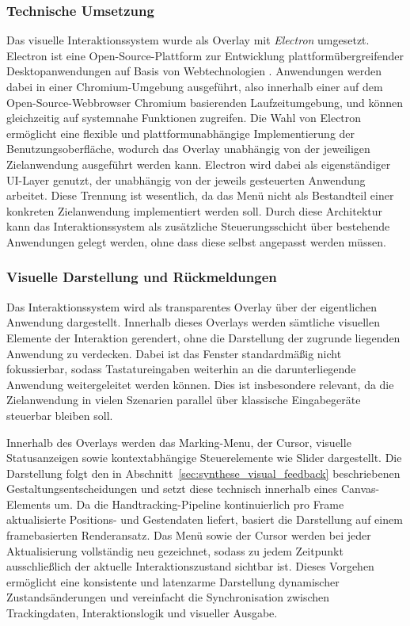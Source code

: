 \subsubsection{Technische Umsetzung}
\label{sec:technische_umsetzung}
Das visuelle Interaktionssystem wurde als Overlay mit \textit{Electron} umgesetzt.
Electron ist eine Open-Source-Plattform zur Entwicklung plattformübergreifender Desktopanwendungen auf Basis von Webtechnologien \parencite{electronDocumentation}. Anwendungen werden dabei in einer Chromium-Umgebung ausgeführt, also innerhalb einer auf dem Open-Source-Webbrowser Chromium basierenden Laufzeitumgebung, und können gleichzeitig auf systemnahe Funktionen zugreifen.
Die Wahl von Electron ermöglicht eine flexible und plattformunabhängige Implementierung der Benutzungsoberfläche, wodurch das Overlay unabhängig von der jeweiligen Zielanwendung ausgeführt werden kann.
Electron wird dabei als eigenständiger UI-Layer genutzt, der unabhängig von der jeweils gesteuerten Anwendung arbeitet. Diese Trennung ist wesentlich, da das Menü nicht als Bestandteil einer konkreten Zielanwendung implementiert werden soll.
Durch diese Architektur kann das Interaktionssystem als zusätzliche Steuerungsschicht über bestehende Anwendungen gelegt werden, ohne dass diese selbst angepasst werden müssen.


\subsubsection{Visuelle Darstellung und Rückmeldungen}
Das Interaktionssystem wird als transparentes Overlay über der eigentlichen Anwendung dargestellt. Innerhalb dieses Overlays werden sämtliche visuellen Elemente der Interaktion gerendert, ohne die Darstellung der zugrunde liegenden Anwendung zu verdecken. Dabei ist das Fenster standardmäßig nicht fokussierbar, sodass Tastatureingaben weiterhin an die darunterliegende Anwendung weitergeleitet werden können. Dies ist insbesondere relevant, da die Zielanwendung in vielen Szenarien parallel über klassische Eingabegeräte steuerbar bleiben soll.

Innerhalb des Overlays werden das Marking-Menu, der Cursor, visuelle Statusanzeigen sowie kontextabhängige Steuerelemente wie Slider dargestellt. Die Darstellung folgt den in Abschnitt~\ref{sec:synthese_visual_feedback} beschriebenen Gestaltungsentscheidungen und setzt diese technisch innerhalb eines Canvas-Elements um.
Da die Handtracking-Pipeline kontinuierlich pro Frame aktualisierte Positions- und Gestendaten liefert, basiert die Darstellung auf einem framebasierten Renderansatz. Das Menü sowie der Cursor werden bei jeder Aktualisierung vollständig neu gezeichnet, sodass zu jedem Zeitpunkt ausschließlich der aktuelle Interaktionszustand sichtbar ist. Dieses Vorgehen ermöglicht eine konsistente und latenzarme Darstellung dynamischer Zustandsänderungen und vereinfacht die Synchronisation zwischen Trackingdaten, Interaktionslogik und visueller Ausgabe.

